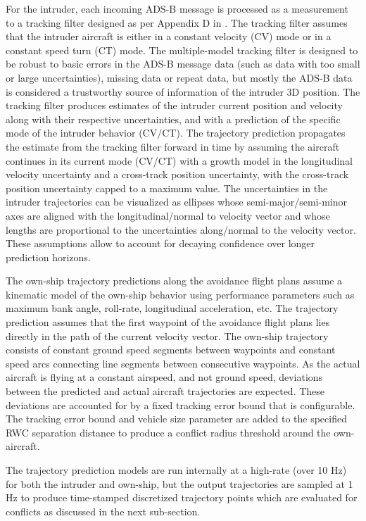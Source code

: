 For the intruder, each incoming ADS-B message is processed as a measurement to a tracking filter designed as per Appendix D in \cite{DO_366A}. The tracking filter assumes that the intruder aircraft is either in a constant velocity (CV) mode or in a constant speed turn (CT) mode. The multiple-model tracking filter is designed to be robust to basic errors in the ADS-B message data (such as data with too small or large uncertainties), missing data or repeat data, but mostly the ADS-B data is considered a trustworthy source of information of the intruder 3D position. The tracking filter produces estimates of the intruder current position and velocity along with their respective uncertainties, and with a prediction of the specific mode of the intruder behavior (CV/CT). The trajectory prediction propagates the estimate from the tracking filter forward in time by assuming the aircraft continues in its current mode (CV/CT) with a growth model in the longitudinal velocity uncertainty and a cross-track position uncertainty, with the cross-track position uncertainty capped to a maximum value. The uncertainties in the intruder trajectories can be visualized as ellipses whose semi-major/semi-minor axes are aligned with the longitudinal/normal to velocity vector and whose lengths are proportional to the uncertainties along/normal to the velocity vector. These assumptions allow to account for decaying confidence over longer prediction horizons.

The own-ship trajectory predictions along the avoidance flight plans assume a kinematic model of the own-ship behavior using performance parameters such as maximum bank angle, roll-rate, longitudinal acceleration, etc. The trajectory prediction assumes that the first waypoint of the avoidance flight plans lies directly in the path of the current velocity vector. The own-ship trajectory consists of constant ground speed segments between waypoints and constant speed arcs connecting line segments between consecutive waypoints. As the actual aircraft is flying at a constant airspeed, and not ground speed, deviations between the predicted and actual aircraft trajectories are expected. These deviations are accounted for by a fixed tracking error bound that is configurable. The tracking error bound and vehicle size parameter are added to the specified RWC separation distance to produce a conflict radius threshold around the own-aircraft.

The trajectory prediction models are run internally at a high-rate (over 10 Hz) for both the intruder and own-ship, but the output trajectories are sampled at 1 Hz to produce time-stamped discretized trajectory points which are evaluated for conflicts as discussed in the next sub-section.

